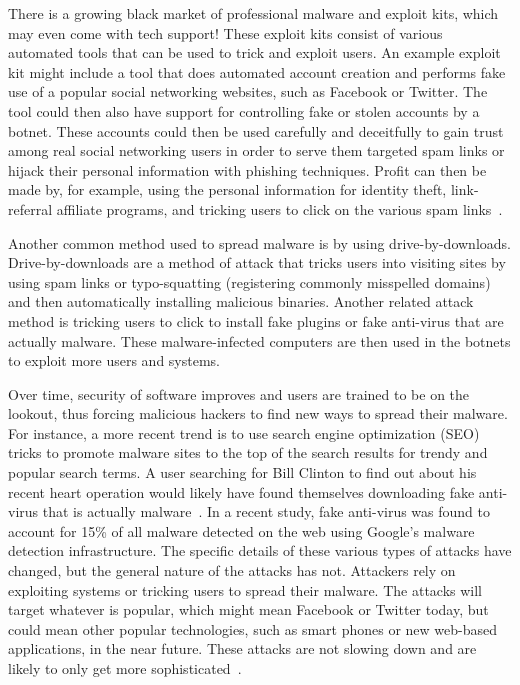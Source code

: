 There is a growing black market of professional malware and exploit kits, which may even come with tech support\cite{paxson_sellingviagra_2009}! These exploit kits consist of various automated tools that can be used to trick and exploit users. An example exploit kit might include a tool that does automated account creation and performs fake use of a popular social networking websites, such as Facebook or Twitter. The tool could then also have support for controlling fake or stolen accounts by a botnet. These accounts could then be used carefully and deceitfully to gain trust among real social networking users in order to serve them targeted spam links or hijack their personal information with phishing techniques. Profit can then be made by, for example, using the personal information for identity theft, link-referral affiliate programs, and tricking users to click on the various spam links~\cite{paxson_sellingviagra_2009}.

Another common method used to spread malware is by using drive-by-downloads. Drive-by-downloads are a method of attack that tricks users into visiting sites by using spam links or typo-squatting (registering commonly misspelled domains) and then automatically installing malicious binaries. Another related attack method is tricking users to click to install fake plugins or fake anti-virus that are actually malware\cite{provos_2007}. These malware-infected computers are then used in the botnets to exploit more users and systems.

Over time, security of software improves and users are trained to be on the lookout, thus forcing malicious hackers to find new ways to spread their malware. For instance, a more recent trend is to use search engine optimization (SEO) tricks to promote malware sites to the top of the search results for trendy and popular search terms. A user searching for Bill Clinton to find out about his recent heart operation would likely have found themselves downloading fake anti-virus that is actually malware~\cite{eWeek_2010}. In a recent study\cite{rajab_2010}, fake anti-virus was found to account for 15\% of all malware detected on the web using Google's malware detection infrastructure. The specific details of these various types of attacks have changed, but the general nature of the attacks has not. Attackers rely on exploiting systems or tricking users to spread their malware. The attacks will target whatever is popular, which might mean Facebook or Twitter today, but could mean other popular technologies, such as smart phones or new web-based applications, in the near future. These attacks are not slowing down and are likely to only get more sophisticated~\cite{wired_2010, damballa_2010,damballa_blog_2010}.

